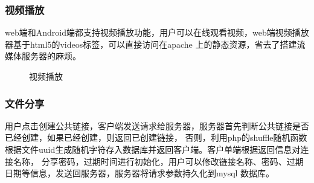 \subsubsection{视频播放}web端和Android端都支持视频播放功能，用户可以在线观看视频，web端视频播放器基于html5的videos标签，可以直接访问在apache
上的静态资源，省去了搭建流媒体服务器的麻烦。
\begin{figure}[htbp]
  \centering
  \centering
  \caption{视频播放}
  \end{figure}
  
\subsubsection{文件分享}
用户点击创建公共链接，客户端发送请求给服务器，服务器首先判断公共链接是否已经创建，如果已经创建，则返回已创建链接，
否则，利用php的shuffle随机函数根据文件uuid生成随机字符存入数据库并返回客户端。客户单端根据返回信息对连接名称，
分享密码，过期时间进行初始化，用户可以修改链接名称、密码、过期日期等信息，发送回服务器，服务器将请求参数持久化到mysql
数据库。

